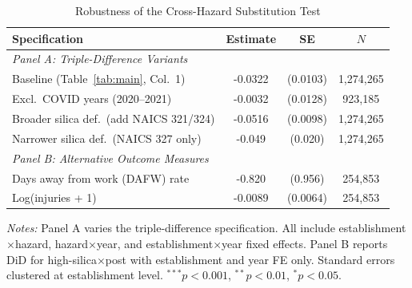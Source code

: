 \begin{table}[t]
\centering
\caption{Robustness of the Cross-Hazard Substitution Test}
\label{tab:robust}
\begin{tabular}{lccc}
\toprule
Specification & Estimate & SE & $N$ \\
\midrule
\multicolumn{4}{l}{\textit{Panel A: Triple-Difference Variants}} \\[3pt]
Baseline (Table~\ref{tab:main}, Col.~1) & -0.0322 & (0.0103) & 1,274,265 \\
Excl.\ COVID years (2020--2021) & -0.0032 & (0.0128) & 923,185 \\
Broader silica def.\ (add NAICS 321/324) & -0.0516 & (0.0098) & 1,274,265 \\
Narrower silica def.\ (NAICS 327 only) & -0.049 & (0.020) & 1,274,265 \\
\midrule
\multicolumn{4}{l}{\textit{Panel B: Alternative Outcome Measures}} \\[3pt]
Days away from work (DAFW) rate & -0.820 & (0.956) & 254,853 \\
Log(injuries + 1) & -0.0089 & (0.0064) & 254,853 \\
\bottomrule
\end{tabular}
\begin{tablenotes}
\small
\item \textit{Notes:} Panel A varies the triple-difference specification. All include
establishment$\times$hazard, hazard$\times$year, and establishment$\times$year fixed effects.
Panel B reports DiD for high-silica$\times$post with establishment and year FE only.
Standard errors clustered at establishment level.
$^{***}p<0.001$, $^{**}p<0.01$, $^{*}p<0.05$.
\end{tablenotes}
\end{table}
